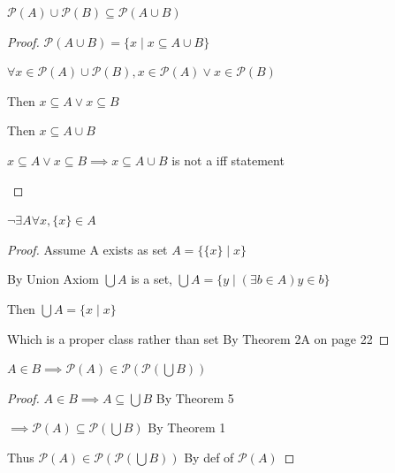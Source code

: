 \documentclass[12pt, a4paper, oneside]{article}
\begin{document}
    \begin{theorem}
        $\mathscr{P}(A) \cup  \mathscr{P}(B) \subseteq \mathscr{P}(A \cup B)$
    \end{theorem}

    \begin{proof}
        $\mathscr{P}(A \cup B) = \{x\mid x \subseteq A \cup B\}$

        $\forall x \in \mathscr{P}(A) \cup  \mathscr{P}(B), x  \in \mathscr{P}(A) \vee x \in \mathscr{P}(B)$

        Then $x \subseteq A \vee x \subseteq B$

        Then $x \subseteq A \cup B$
        \begin{remark}
            $x \subseteq A \vee x \subseteq B \implies x \subseteq A \cup B$ is not a iff statement
        \end{remark}
    \end{proof}
        
    \begin{theorem}
        $\neg \exists A \forall x, \{x\} \in A $
    \end{theorem}

    \begin{proof}
        Assume A exists as set $A = \{\{x\} \mid x \}$
        
        By Union Axiom $\bigcup A$ is a set, $\bigcup A = \{y \mid (\exists b \in A)y\in b\}$

        Then $\bigcup A = \{x\mid x\}$

        Which is a proper class rather than set By Theorem 2A on page 22
    \end{proof}

    \begin{theorem}
        $A \in B \implies \mathscr{P}(A) \in \mathscr{P}(\mathscr{P}(\bigcup B))$
    \end{theorem}
        
    \begin{proof}
        $A \in B \implies A \subseteq \bigcup B$ By Theorem 5

        $\implies \mathscr{P}(A) \subseteq \mathscr{P}(\bigcup B)$ By Theorem 1

        Thus $\mathscr{P}(A) \in \mathscr{P}(\mathscr{P}(\bigcup B))$ By def of $\mathscr{P}(A)$
    \end{proof}
\end{document}
